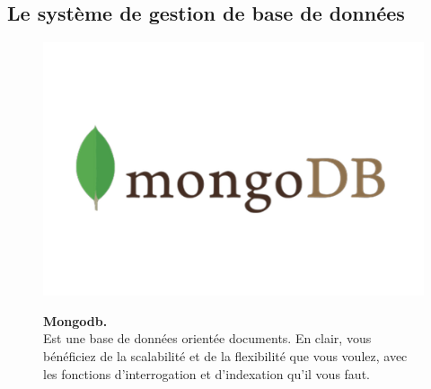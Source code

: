 \subsection{Le système de gestion de base de données}
\begin{figure}[H]
    \centering
    \begin{minipage}[c]{0.3\textwidth}
        \includegraphics[width=\linewidth]{projet/images/diagramme de sequance/images/mongodb.png}
    \end{minipage}
    \hspace{1cm}
    \begin{minipage}[c]{0.6\textwidth}
        \textbf{Mongodb.}\\[0.5em]
     Est une base de données orientée documents. En clair, vous bénéficiez de la scalabilité et de la flexibilité que vous voulez, avec les fonctions d’interrogation et d’indexation qu’il vous faut. \cite{ref15}
    \end{minipage}
\end{figure}
